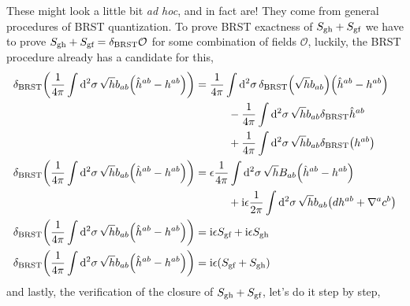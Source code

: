 These might look a little bit \textit{ad hoc}, and in fact are! They come from general procedures of BRST quantization. To prove BRST exactness of $S_{\textnormal{gh}}+S_{\textnormal{gf}}$ we have to prove $S_{\textnormal{gh}}+S_{\textnormal{gf}}=\delta_{\textnormal{BRST}}\mathcal O$ 
for some combination of fields $\mathcal O$, luckily, the BRST procedure already has a candidate for this,
\begin{align*}
    \delta_{\textnormal{BRST}}\qty(\frac{1}{4\pi}\int\dd[2]{\sigma}\sqrt{h}b_{ab}\qty(\hat h^{ab}-h^{ab}))&=\frac{1}{4\pi}\int\dd[2]{\sigma}\delta_{\textnormal{BRST}}\qty(\sqrt{h}b_{ab})\qty(\hat h^{ab}-h^{ab})\\
    &\quad\quad\quad-\frac{1}{4\pi}\int\dd[2]{\sigma}\sqrt{h}b_{ab}\delta_{\textnormal{BRST}}\hat h^{ab}\\
    &\quad\quad\quad+\frac{1}{4\pi}\int\dd[2]{\sigma}\sqrt{h}b_{ab}\delta_{\textnormal{BRST}}\qty(h^{ab})\\
    \delta_{\textnormal{BRST}}\qty(\frac{1}{4\pi}\int\dd[2]{\sigma}\sqrt{h}b_{ab}\qty(\hat h^{ab}-h^{ab}))&=\epsilon\frac{1}{4\pi}\int\dd[2]{\sigma}\sqrt{h}B_{ab}\qty(\hat h^{ab}-h^{ab})\\
    &\quad\quad\quad+\textnormal{i}\epsilon\frac{1}{2\pi}\int\dd[2]{\sigma}\sqrt{h}b_{ab}\qty(dh^{ab}+\nabla^{a}c^{b})\\
    \delta_{\textnormal{BRST}}\qty(\frac{1}{4\pi}\int\dd[2]{\sigma}\sqrt{h}b_{ab}\qty(\hat h^{ab}-h^{ab}))&=\textnormal{i}\epsilon S_{\textnormal{gf}}+\textnormal{i}\epsilon S_{\textnormal{gh}}\\
    \delta_{\textnormal{BRST}}\qty(\frac{1}{4\pi}\int\dd[2]{\sigma}\sqrt{h}b_{ab}\qty(\hat h^{ab}-h^{ab}))&=\textnormal{i}\epsilon \qty(S_{\textnormal{gf}}+S_{\textnormal{gh}})
\end{align*}
and lastly, the verification of the closure of $S_{\textnormal{gh}}+S_{\textnormal{gf}}$, let's do it step by step,
